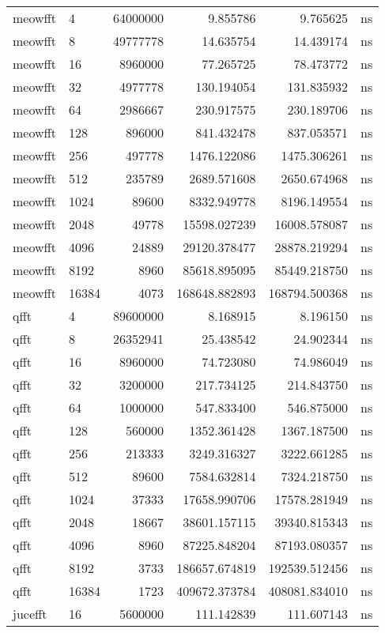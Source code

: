 \begin{tabular}{llrrrl}
meowfft & 4 & 64000000 & 9.855786 & 9.765625 & ns \\
meowfft & 8 & 49777778 & 14.635754 & 14.439174 & ns \\
meowfft & 16 & 8960000 & 77.265725 & 78.473772 & ns \\
meowfft & 32 & 4977778 & 130.194054 & 131.835932 & ns \\
meowfft & 64 & 2986667 & 230.917575 & 230.189706 & ns \\
meowfft & 128 & 896000 & 841.432478 & 837.053571 & ns \\
meowfft & 256 & 497778 & 1476.122086 & 1475.306261 & ns \\
meowfft & 512 & 235789 & 2689.571608 & 2650.674968 & ns \\
meowfft & 1024 & 89600 & 8332.949778 & 8196.149554 & ns \\
meowfft & 2048 & 49778 & 15598.027239 & 16008.578087 & ns \\
meowfft & 4096 & 24889 & 29120.378477 & 28878.219294 & ns \\
meowfft & 8192 & 8960 & 85618.895095 & 85449.218750 & ns \\
meowfft & 16384 & 4073 & 168648.882893 & 168794.500368 & ns \\
qfft & 4 & 89600000 & 8.168915 & 8.196150 & ns \\
qfft & 8 & 26352941 & 25.438542 & 24.902344 & ns \\
qfft & 16 & 8960000 & 74.723080 & 74.986049 & ns \\
qfft & 32 & 3200000 & 217.734125 & 214.843750 & ns \\
qfft & 64 & 1000000 & 547.833400 & 546.875000 & ns \\
qfft & 128 & 560000 & 1352.361428 & 1367.187500 & ns \\
qfft & 256 & 213333 & 3249.316327 & 3222.661285 & ns \\
qfft & 512 & 89600 & 7584.632814 & 7324.218750 & ns \\
qfft & 1024 & 37333 & 17658.990706 & 17578.281949 & ns \\
qfft & 2048 & 18667 & 38601.157115 & 39340.815343 & ns \\
qfft & 4096 & 8960 & 87225.848204 & 87193.080357 & ns \\
qfft & 8192 & 3733 & 186657.674819 & 192539.512456 & ns \\
qfft & 16384 & 1723 & 409672.373784 & 408081.834010 & ns \\
jucefft & 16 & 5600000 & 111.142839 & 111.607143 & ns \\

\end{tabular}
